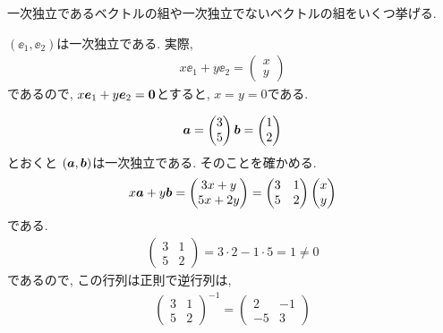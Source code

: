 一次独立であるベクトルの組や一次独立でないベクトルの組をいくつ挙げる.
\begin{example}
  \label{ex:linindep:std}
  $(\ee_1,\ee_2)$は一次独立である.
  実際,
  \begin{align*}
    x\ee_1+y\ee_2=
    \begin{pmatrix}
      x\\y
    \end{pmatrix}
  \end{align*}
  であるので, $x\boldsymbol{e}_1+y\boldsymbol{e}_2=\boldsymbol{0}$とすると, $x=y=0$である.
\end{example}

\begin{example}
  \label{ex:linindep:2}
  \begin{align*}
    \boldsymbol{a}=\begin{pmatrix}3\\5\end{pmatrix}
    \boldsymbol{b}=\begin{pmatrix}1\\2\end{pmatrix}
  \end{align*}
  とおくと
  $(\boldsymbol{a},\boldsymbol{b})$は一次独立である.
  そのことを確かめる.
  \begin{align*}
    x\boldsymbol{a}+y\boldsymbol{b}=
    \begin{pmatrix}
      3x+y\\5x+2y
    \end{pmatrix}
    =
    \begin{pmatrix}
      3&1\\5&2
    \end{pmatrix}
    \begin{pmatrix}
      x\\y
    \end{pmatrix}
  \end{align*}
  である.
  \begin{align*}
    \begin{pmatrix}
      3&1\\5&2
    \end{pmatrix}
=3\cdot 2-1\cdot 5=1\neq0
  \end{align*}
  であるので, この行列は正則で逆行列は,
  \begin{align*}
    \begin{pmatrix}
      3&1\\5&2
    \end{pmatrix}^{-1}
=    
    \begin{pmatrix}
      2&-1\\-5&3

\end{pmatrix}
\end{align*}
\end{example}
